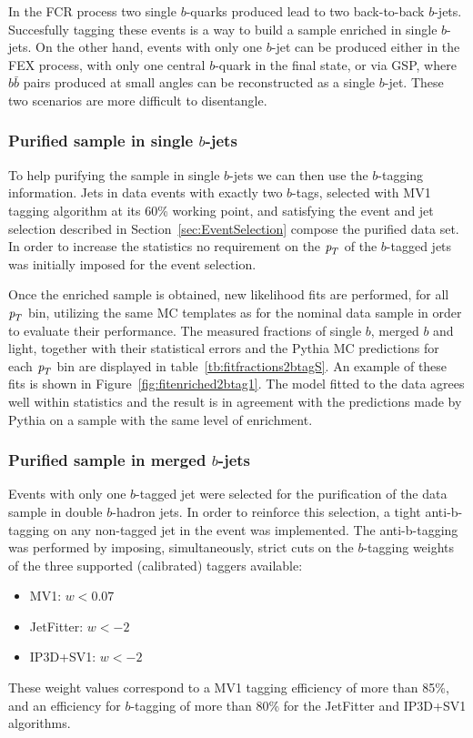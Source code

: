 In the FCR process two single $b$-quarks produced lead to two back-to-back $b$-jets. Succesfully tagging these events is a way to build a sample enriched in single $b$-jets.  On the other hand, events with only one $b$-jet can be produced either in the FEX process, with only one central $b$-quark in the final state, or via GSP, where $b\bar{b}$ pairs produced at small angles can be reconstructed as a single $b$-jet. These two scenarios are more difficult to disentangle. %

\subsubsection{Purified sample in single $b$-jets}

To help purifying the sample in single $b$-jets we can then use the $b$-tagging information. Jets in data events with exactly two $b$-tags, selected with MV1 tagging algorithm at its 60\% working point, and satisfying the event and jet selection described in Section~\ref{sec:EventSelection} compose the purified data set.  In order to increase the statistics no requirement on the ${\emph{p}_{T}}$ of the $b$-tagged jets was initially imposed for the event selection. 

Once the enriched sample is obtained, new likelihood fits are performed, for all ${\emph{p}_{T}}$ bin, utilizing the same MC templates as for the nominal data sample in order to evaluate their performance.  
The measured fractions of single $b$, merged $b$ and light, together with their statistical errors and the {\sc Pythia} MC predictions for each ${\emph{p}_{T}}$ bin are displayed in table~\ref{tb:fitfractions2btagS}. An example of these fits is shown  in  Figure~\ref{fig:fitenriched2btag1}. %
 The model fitted to the data agrees well within statistics and the result is in agreement with the predictions made by {\sc Pythia} on a sample with the same level of enrichment.  

\subsubsection{Purified sample in merged $b$-jets}

Events with only one $b$-tagged jet were selected for the purification of the data sample in double $b$-hadron jets.  In order to reinforce this selection, a tight anti-b-tagging on any non-tagged jet in the event was implemented.  The anti-b-tagging was performed by imposing, simultaneously, strict cuts on the $b$-tagging weights of the three supported (calibrated) taggers available:
%
\begin{itemize}
\item
MV1:  $w < 0.07$  
\item
JetFitter:  $w < -2$
\item
IP3D+SV1:  $w < -2$
\end{itemize}
%
These weight values correspond to a MV1 tagging efficiency of more than 85\%, and an efficiency for $b$-tagging of more than 80\% for the JetFitter and IP3D+SV1 algorithms. 

